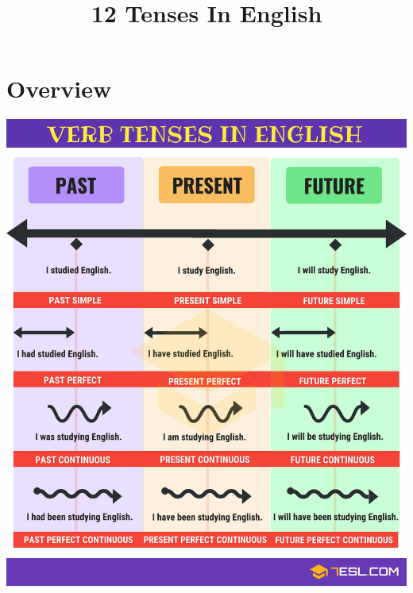 \title{\Huge \textbf{12 Tenses In English}}

\maketitle
\tableofcontents
\newcommand{\structure}[3]{
    \newcolbox{Structure}{
        \begin{tabular}{l|l}
            \green{(+)}  & #1 \\
            \red{(-)}    & #2 \\
            \yellow{(?)} & #3 \\
        \end{tabular}
    }
}
\newcommand{\dStructure}[6]{
    \newcolbox{Structure}{
        \begin{tabular}{l|l}
            \green{(+)}  & #1 \\
            \red{(-)}    & #2 \\
            \yellow{(?)} & #3 \\
            \hline
            \green{(+)}  & #4 \\
            \red{(-)}    & #5 \\
            \yellow{(?)} & #6 \\
        \end{tabular}
    }
}

\chapter{Overview}
\centering
\includegraphics[width=\textwidth]{project-folders/12Tenses/englishTensesOverView.jpg}

